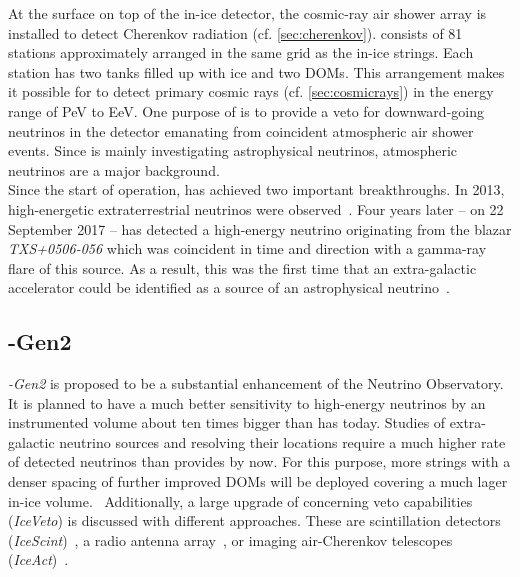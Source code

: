 At the surface on top of the in-ice detector, the cosmic-ray air shower array \icetop is installed to detect Cherenkov radiation (cf. \ref{sec:cherenkov}). \icetop consists of 81 stations approximately arranged in the same grid as the in-ice strings. Each station has two tanks filled up with ice and two \icecube DOMs. This arrangement makes it possible for \icetop to detect primary cosmic rays (cf. \ref{sec:cosmicrays}) in the energy range of \si{\peta\electronvolt} to \si{\exa\electronvolt}. One purpose of \icetop is to provide a veto for downward-going neutrinos in the \icecube detector emanating from coincident atmospheric air shower events. \cite{icecube:instrumentation} Since \icecube is mainly investigating astrophysical neutrinos, atmospheric neutrinos are a major background.\\

Since the start of operation, \icecube has achieved two important breakthroughs. In 2013, high-energetic extraterrestrial neutrinos were observed~\cite{icecube:he_neutrino}. Four years later -- on \num{22} September 2017 -- \icecube has detected a high-energy neutrino originating from the blazar \textit{TXS+0506-056} which was coincident in time and direction with a gamma-ray flare of this source. As a result, this was the first time that an extra-galactic accelerator could be identified as a source of an astrophysical neutrino~\cite{icecube:txs}.

\subsection{\icecube-Gen2}

\textit{\icecube-Gen2} is proposed to be a substantial enhancement of the \icecube Neutrino Observatory. It is planned to have a much better sensitivity to high-energy neutrinos by an instrumented volume about ten times bigger than \icecube has today. Studies of extra-galactic neutrino sources and resolving their locations require a much higher rate of detected neutrinos than \icecube provides by now. For this purpose, more strings with a denser spacing of further improved DOMs will be deployed covering a much lager in-ice volume.~\cite{icecube:iceact,icecube:gen2} Additionally, a large upgrade of \icetop concerning veto capabilities (\textit{IceVeto}) is discussed with different approaches. These are scintillation detectors (\textit{IceScint})~\cite{icecube:gen2:icescint}, a radio antenna array~\cite{icecube:gen2:radio}, or imaging air-Cherenkov telescopes (\textit{IceAct})~\cite{iacts:extension,icecube:iceact}.

